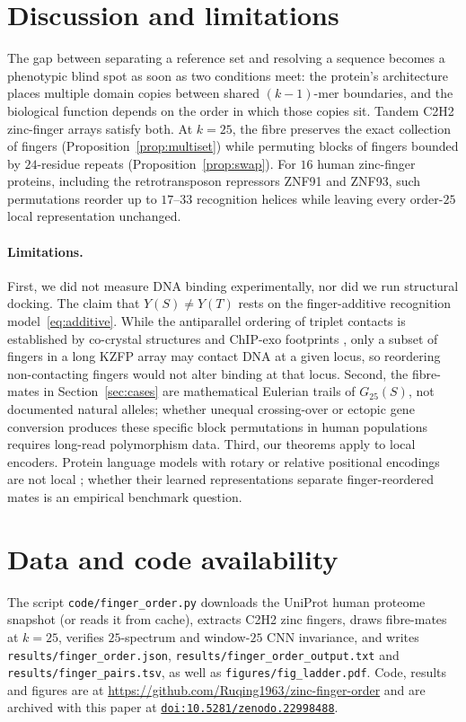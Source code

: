 \documentclass[11pt]{article}
\newcommand{\doi}[1]{\href{https://doi.org/#1}{\nolinkurl{doi:#1}}}
\theoremstyle{plain}
\theoremstyle{definition}
\theoremstyle{remark}
\begin{document}
\section{Discussion and limitations}\label{sec:discussion}

The gap between separating a reference set and resolving a sequence becomes a phenotypic blind spot as soon as two
conditions meet: the protein's architecture places multiple domain copies between shared $(k-1)$-mer boundaries, and
the biological function depends on the order in which those copies sit. Tandem C2H2 zinc-finger arrays satisfy both.
At $k=25$, the fibre preserves the exact collection of fingers (Proposition~\ref{prop:multiset}) while permuting blocks
of fingers bounded by $24$-residue repeats (Proposition~\ref{prop:swap}). For $16$ human zinc-finger proteins,
including the retrotransposon repressors ZNF91 and ZNF93, such permutations reorder up to $17$--$33$ recognition
helices while leaving every order-$25$ local representation unchanged.

\paragraph{Limitations.} First, we did not measure DNA binding experimentally, nor did we run structural docking. The
claim that $Y(S)\ne Y(T)$ rests on the finger-additive recognition model~\eqref{eq:additive}. While the antiparallel
ordering of triplet contacts is established by co-crystal structures and ChIP-exo footprints
\cite{PavletichPabo91,Wolfe00,Imbeault17}, only a subset of fingers in a long KZFP array may contact DNA at a given
locus, so reordering non-contacting fingers would not alter binding at that locus. Second, the fibre-mates in
Section~\ref{sec:cases} are mathematical Eulerian trails of $G_{25}(S)$, not documented natural alleles; whether unequal
crossing-over or ectopic gene conversion produces these specific block permutations in human populations requires
long-read polymorphism data. Third, our theorems apply to local encoders. Protein language models with rotary or
relative positional encodings are not local \cite{CC26d}; whether their learned representations separate
finger-reordered mates is an empirical benchmark question.

\section*{Data and code availability}
The script \texttt{code/finger\_order.py} downloads the UniProt human proteome snapshot (or reads it from cache),
extracts C2H2 zinc fingers, draws fibre-mates at $k=25$, verifies $25$-spectrum and window-$25$ CNN invariance, and
writes \texttt{results/finger\_order.json}, \texttt{results/finger\_order\_output.txt} and
\texttt{results/finger\_pairs.tsv}, as well as \texttt{figures/fig\_ladder.pdf}. Code, results and figures are at
\url{https://github.com/Ruqing1963/zinc-finger-order} and are archived with this paper at
\doi{10.5281/zenodo.22998488}.
\end{document}
